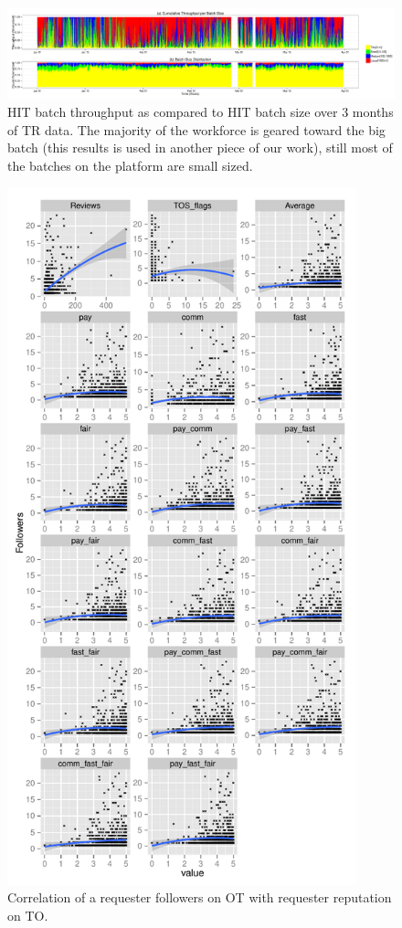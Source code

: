 \documentclass{llncs}
\begin{document}
\begin{figure}[htbp]
	\centering
		\includegraphics[width=1.2\textwidth]{figures/analysis_hour}
	\caption{HIT batch throughput as compared to HIT batch size over 3 months of TR data. The majority of the workforce is geared toward the big batch (this results is used in another piece of our work), still most of the batches on the platform are small sized.}
	\label{fig:figure1}
\end{figure}

\begin{figure}[htbp]
	\centering
		\includegraphics[width=0.9\textwidth]{figures/correlation}
	\caption{Correlation of a requester followers on OT with requester reputation on TO.}
	\label{fig:figure2}
\end{figure}
\end{document}
